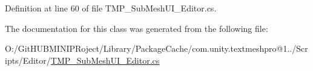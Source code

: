 Definition at line 60 of file T\+M\+P\+\_\+\+Sub\+Mesh\+U\+I\+\_\+\+Editor.\+cs.



The documentation for this class was generated from the following file\+:\begin{DoxyCompactItemize}
\item 
O\+:/\+Git\+H\+U\+B\+M\+I\+N\+I\+P\+Roject/\+Library/\+Package\+Cache/com.\+unity.\+textmeshpro@1../\+Scripts/\+Editor/\mbox{\hyperlink{_t_m_p___sub_mesh_u_i___editor_8cs}{T\+M\+P\+\_\+\+Sub\+Mesh\+U\+I\+\_\+\+Editor.\+cs}}\end{DoxyCompactItemize}
